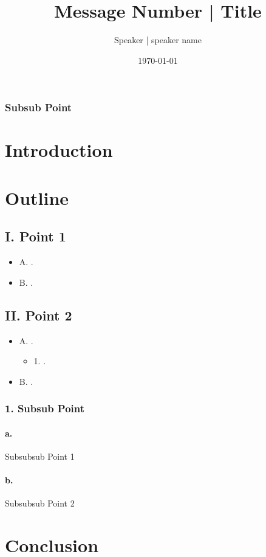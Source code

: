 \documentclass{article}
\newenvironment{notesoutline}{
  \begin{itemize}[label=--,left=1em,labelsep=1em]
}{
  \end{itemize}
}
\begin{document}
\title{Message Number | Title}
\author{Speaker | speaker name}
\date{\today}

\maketitle

\thispagestyle{topbar}  %

\subsubsection*{Subsub Point}
\lipsum[1]

\section*{Introduction}
\lipsum[1]

\section*{Outline}

\subsection*{I. Point 1}
\lipsum[1]
\begin{notesoutline}
  \item[A.]
    .
  \item[B.]
    .
\end{notesoutline}

\subsection*{II. Point 2}
\begin{notesoutline}
  \item[A.] 
    .
    \begin{notesoutline}
      \item[1.] 
        .
    \end{notesoutline}
  \item[B.] 
    .
\end{notesoutline}

\subsubsection*{1. Subsub Point}
\begin{notesoutline}
  \paragraph{a.} Subsubsub Point 1
  \lipsum[3]
  
  \paragraph{b.} Subsubsub Point 2
  \lipsum[4]
\end{notesoutline}

\section*{Conclusion}
\lipsum[2]
\end{document}
